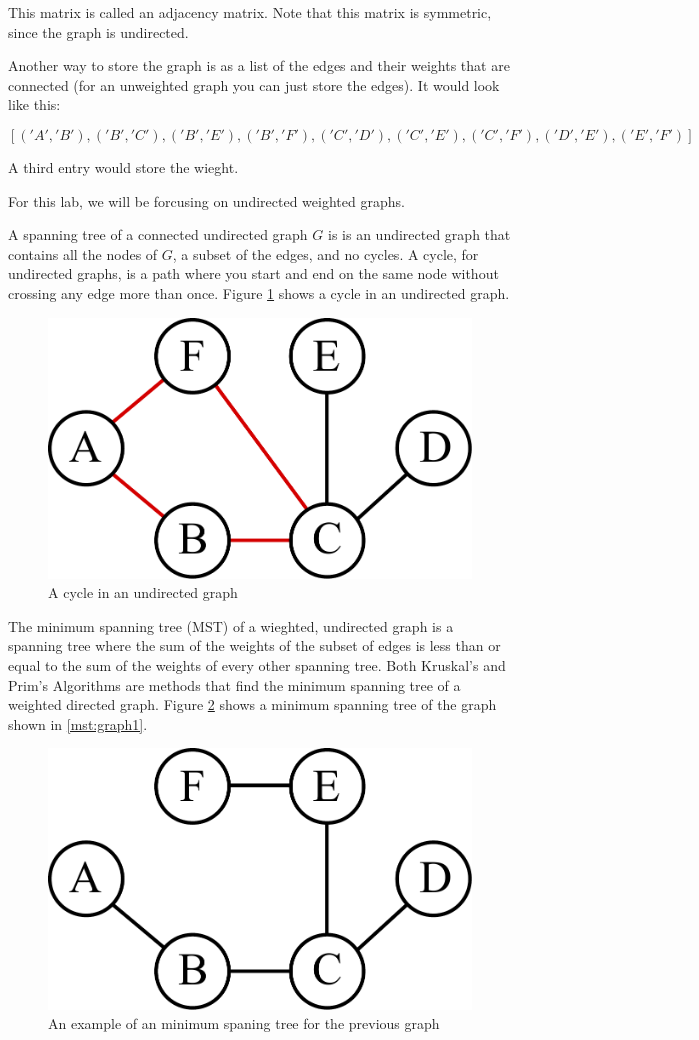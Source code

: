 This matrix is called an adjacency matrix.
Note that this matrix is symmetric, since the graph is undirected. 

Another way to store the graph is as a list of the edges and their weights that are connected (for an unweighted graph you can just store the edges).
It would look like this:

\[
[('A', 'B'),
 ('B', 'C'),
 ('B', 'E'),
 ('B', 'F'),
 ('C', 'D'),
 ('C', 'E'),
 ('C', 'F'),
 ('D', 'E'),
 ('E', 'F')]
\]

A third entry would store the wieght.

For this lab, we will be forcusing on undirected weighted graphs. 

A spanning tree of a connected undirected graph $G$ is is an undirected graph that contains all the nodes of $G$, a subset of the edges, and no cycles.
A cycle, for undirected graphs, is a path where you start and end on the same node without crossing any edge more than once.
Figure \ref{mst:graph3} shows a cycle in an undirected graph.

\begin{figure}[H]
\includegraphics[width = .4\textwidth]{graph3.pdf}
\caption{A cycle in an undirected graph}
\label{mst:graph3}
\end{figure}

The minimum spanning tree (MST) of a wieghted, undirected graph is a spanning tree where the sum of the weights of the subset of edges is less than or equal to the sum of the weights of every other spanning tree.
Both Kruskal's and Prim's Algorithms are methods that find the minimum spanning tree of a weighted directed graph.
Figure \ref{mst:graph2} shows a minimum spanning tree of the graph shown in \ref{mst:graph1}.

\begin{figure}[H]
\includegraphics[width = .4\textwidth]{graph2.pdf}
\caption{An example of an minimum spaning tree for the previous graph}
\label{mst:graph2}
\end{figure}

